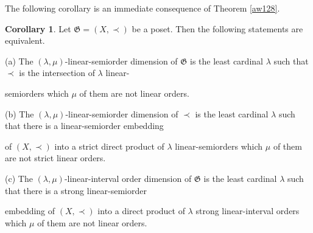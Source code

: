 \documentclass{article}
\theoremstyle{definition}
\newtheorem{corollary}[theorem]{Corollary}
\begin{document}
The following corollary is an immediate consequence of Theorem \ref{aw128}.






\begin{corollary}\label{awxa128} Let $\mathfrak{G}=(X,\prec)$ be a poset. Then the following statements are equivalent.
\par\noindent
(a) The $(\lambda,\mu)$-linear-semiorder dimension of $\mathfrak{G}$ is the least cardinal $\lambda$ such that $\prec$ is the intersection of $\lambda$ linear-
\par
\!\!\! \!\!
semiorders which $\mu$ of them are not linear orders.
\par\noindent
(b) The $(\lambda,\mu)$-linear-semiorder dimension of $\prec$
is the least cardinal $\lambda$ such that there is a linear-semiorder embedding 
\par
\!\!\! \!\!
of $(X,\prec)$ into a strict direct product of $\lambda$ linear-semiorders
which $\mu$ of them are not strict linear orders.
\par\noindent
(c) The $(\lambda,\mu)$-linear-interval order dimension of $\mathfrak{G}$
is the least cardinal $\lambda$ such that there is a strong linear-semiorder 
\par
\!\!\! \!\!
embedding of $(X,\prec)$ into a direct product of $\lambda$ strong linear-interval orders which $\mu$ of them are not linear
orders.
\end{corollary}
\end{document}
